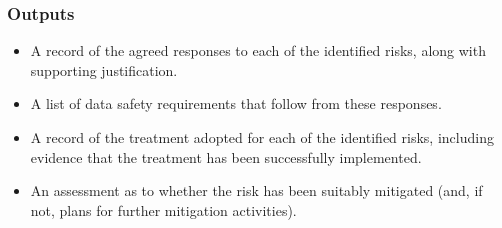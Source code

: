 \subsubsection{Outputs}
\begin{itemize}
	\item A record of the agreed \glspl{response} to each of the identified risks, along with supporting justification.
	\item A list of \glspl{data safety requirement} that follow from these \glspl{response}.
	\item A record of the \gls{treatment} adopted for each of the identified risks, including evidence that the \gls{treatment} has been successfully implemented.
	\item An assessment as to whether the risk has been suitably mitigated (and, if not, plans for further \gls{mitigation} activities).
\end{itemize}
